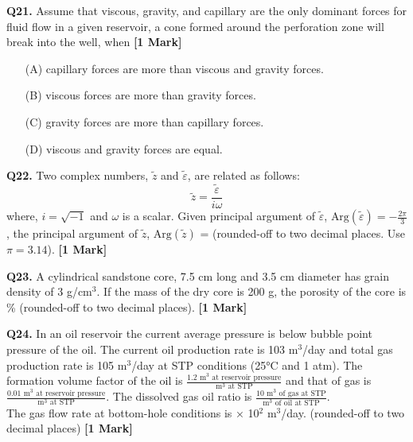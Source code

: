 \documentclass[11pt]{article}
\newcommand{\questiona}[2]{
    \noindent\textbf{Q#2.} #1 \hfill \textbf{[1 Mark]}
}
\begin{document}
\questiona{Assume that viscous, gravity, and capillary are the only dominant forces for fluid flow in a given reservoir, a cone formed around the perforation zone will break into the well, when}{21}
\begin{enumerate}
    \item[(A)] capillary forces are more than viscous and gravity forces.  
    \item[(B)] viscous forces are more than gravity forces.  
    \item[(C)] gravity forces are more than capillary forces.  
    \item[(D)] viscous and gravity forces are equal.  
\end{enumerate}
\vspace{0.5cm}

\questiona{Two complex numbers, \( \tilde{z} \) and \( \tilde{\varepsilon} \), are related as follows: \[ \tilde{z} = \frac{\tilde{\varepsilon}}{i\omega} \] where, \( i = \sqrt{-1} \) and \( \omega \) is a scalar. Given principal argument of \( \tilde{\varepsilon} \), \( \text{Arg}(\tilde{\varepsilon}) = -\frac{2\pi}{3} \), the principal argument of \( \tilde{z} \), \( \text{Arg}(\tilde{z}) \) = \underline{\hspace{3cm}} (rounded-off to two decimal places. Use \( \pi = 3.14 \)).}{22}
\vspace{0.5cm}

\questiona{A cylindrical sandstone core, 7.5 cm long and 3.5 cm diameter has grain density of 3 g/cm\(^3\). If the mass of the dry core is 200 g, the porosity of the core is \underline{\hspace{3cm}}\% (rounded-off to two decimal places).}{23}
\vspace{0.5cm}

\questiona{In an oil reservoir the current average pressure is below bubble point pressure of the oil. The current oil production rate is 103 m\(^3\)/day and total gas production rate is 105 m\(^3\)/day at STP conditions (25°C and 1 atm). The formation volume factor of the oil is \( \frac{1.2 \text{ m}^3 \text{ at reservoir pressure}}{\text{m}^3 \text{ at STP}} \) and that of gas is \( \frac{0.01 \text{ m}^3 \text{ at reservoir pressure}}{\text{m}^3 \text{ at STP}} \). The dissolved gas oil ratio is \( \frac{10 \text{ m}^3 \text{ of gas at STP}}{\text{m}^3 \text{ of oil at STP}} \). \\ The gas flow rate at bottom-hole conditions is \underline{\hspace{3cm}} × 10\(^2\) m\(^3\)/day. (rounded-off to two decimal places)}{24}
\vspace{0.5cm}
\end{document}
